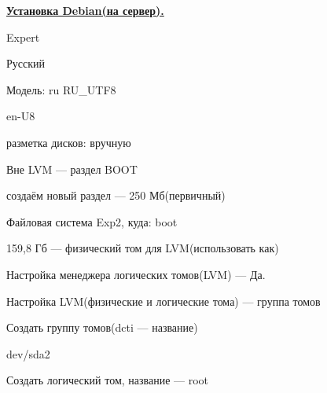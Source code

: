 \par 
\underline{\textbf{Установка Debian(на сервер).}}
\par 
Expert
\par 
Русский
\par 
Модель: ru RU\_UTF8
\par 
en-U8
\par 
разметка дисков: вручную
\par 
Вне LVM — раздел BOOT
\par 
создаём новый раздел — 250
Мб(первичный)
\par 
Файловая система Exp2, куда: boot
\par 
159,8 Гб — физический том для LVM(использовать
как)
\par 
Настройка менеджера логических томов(LVM)
— Да.
\par 
Настройка LVM(физические и логические
тома) — группа томов
\par 
Создать группу томов(dcti — название)
\par 
dev/sda2
\par 
Создать логический том, название — root

